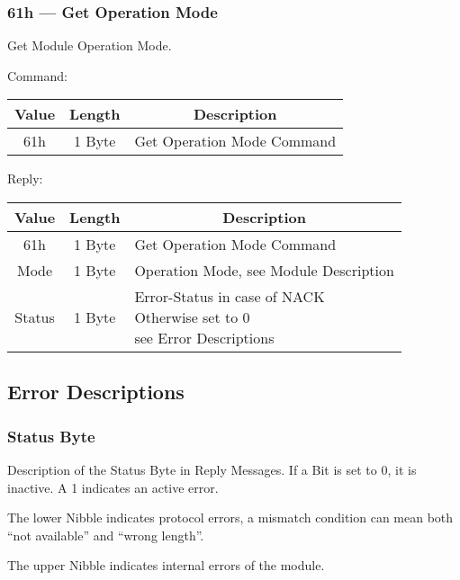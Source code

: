 \subsubsection{61h --- Get Operation Mode}
Get Module Operation Mode. 

Command:
\begin{table}[H]
    \centering
    \begin{tabular}{|c|c|l|}
        \hline
        \textbf{Value}   &   \textbf{Length} & \multicolumn{1}{|c|}{\textbf{Description}}\\ \hline \hline
        61h   &  1 Byte & Get Operation Mode Command \\ \hline
    \end{tabular}
\label{tab:CAN-61-C}
\end{table}
Reply:
\begin{table}[H]
    \centering
    \begin{tabular}{|c|c|l|}
        \hline
        \textbf{Value}   &   \textbf{Length} & \multicolumn{1}{|c|}{\textbf{Description}}\\ \hline \hline
        61h   &  1 Byte & Get Operation Mode Command \\ \hline
        Mode & 1 Byte & Operation Mode, see Module Description\\ \hline
        Status & 1 Byte & \makecell[l]{Error-Status in case of NACK \\ Otherwise set to 0\\see Error Descriptions}\\ \hline
    \end{tabular}
\label{tab:CAN-61-R}
\end{table}



\subsection{Error Descriptions}
\subsubsection{Status Byte}
Description of the Status Byte in Reply Messages. If a Bit is set to 0, it is inactive. A 1 indicates an active error.

The lower Nibble indicates protocol errors, a mismatch condition can mean both ``not available'' and ``wrong length''. 

The upper Nibble indicates internal errors of the module. 

